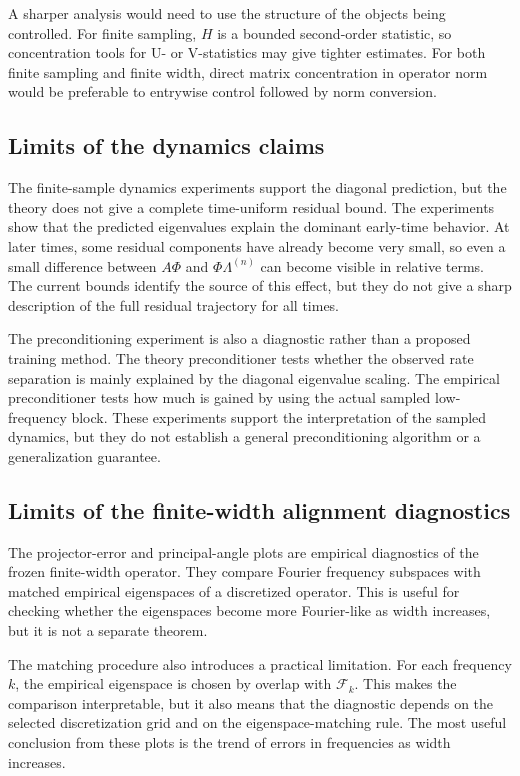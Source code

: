 A sharper analysis would need to use the structure of the objects being
controlled. For finite sampling, \(H\) is a bounded second-order statistic, so
concentration tools for U- or V-statistics may give tighter estimates. For both
finite sampling and finite width, direct matrix concentration in operator norm
would be preferable to entrywise control followed by norm conversion.

\subsection{Limits of the dynamics claims}
\label{subsec:discussion-limitations-dynamics}

The finite-sample dynamics experiments support the diagonal prediction, but the
theory does not give a complete time-uniform residual bound. The experiments
show that the predicted eigenvalues explain the dominant early-time behavior.
At later times, some residual components have already become very small, so even
a small difference between \(A\Phi\) and \(\Phi\Lambda^{(n)}\) can become visible
in relative terms. The current bounds identify the source of this effect, but
they do not give a sharp description of the full residual trajectory for all
times.

The preconditioning experiment is also a diagnostic rather than a proposed
training method. The theory preconditioner tests whether the observed rate
separation is mainly explained by the diagonal eigenvalue scaling. The empirical
preconditioner tests how much is gained by using the actual sampled
low-frequency block. These experiments support the interpretation of the
sampled dynamics, but they do not establish a general preconditioning algorithm
or a generalization guarantee.

\subsection{Limits of the finite-width alignment diagnostics}
\label{subsec:discussion-limitations-alignment}

The projector-error and principal-angle plots are empirical diagnostics of the
frozen finite-width operator. They compare Fourier frequency subspaces with
matched empirical eigenspaces of a discretized operator. This is useful for
checking whether the eigenspaces become more Fourier-like as width increases,
but it is not a separate theorem.

The matching procedure also introduces a practical limitation. For each
frequency \(k\), the empirical eigenspace is chosen by overlap with
\(\mathcal F_k\). This makes the comparison interpretable, but it also means
that the diagnostic depends on the selected discretization grid and on the
eigenspace-matching rule. The most useful conclusion from these plots is the trend
of errors in frequencies as width increases.

